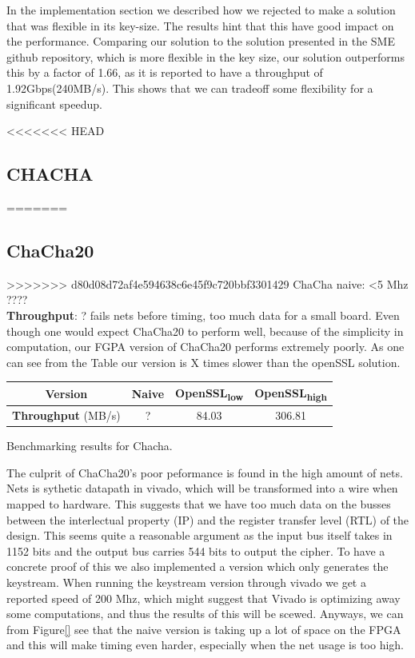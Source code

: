 \documentclass[a4paper]{article}
\begin{document}
\begin{enumerate}
\begin{table}[htbp]
\end{table}
In the implementation section we described how we rejected to make a solution that was flexible in its key-size. The results hint that this have good impact on the performance. Comparing our solution to the solution presented in the SME github repository, which is more flexible in the key size, our solution outperforms this by a factor of 1.66, as it is reported to have a throughput of 1.92Gbps(240MB/s)\cite{sme}. This shows that we can tradeoff some flexibility for a significant speedup.


<<<<<<< HEAD
\subsection{CHACHA}
\label{sec:orge79be4e}
=======
\subsection{ChaCha20}
\label{sec:org6c33309}
>>>>>>> d80d08d72af4e594638c6e45f9c720bbf3301429
ChaCha naive: <5 Mhz ????\\
\textbf{Throughput}: ?
fails nets before timing, too much data for a small board.
Even though one would expect ChaCha20 to perform well, because of the simplicity in computation, our FGPA version of ChaCha20 performs extremely poorly. As one can see from the Table our version is X times slower than the openSSL solution.
\begin{table}[htbp]
\centering
\begin{tabular}{|c|c|c|c|}
\hline
\textbf{Version} & Naive & OpenSSL\textsubscript{low} & OpenSSL\textsubscript{high}\\
\hline
\textbf{Throughput} (MB/s) & ? & 84.03 & 306.81\\
\hline
\end{tabular}
Benchmarking results for Chacha.

\end{table}
The culprit of ChaCha20's poor peformance is found in the high amount of nets. Nets is sythetic datapath in vivado, which will be transformed into a wire when mapped to hardware. This suggests that we have too much data on the busses between the interlectual property (IP) and the register transfer level (RTL) of the design. This seems quite a reasonable argument as the input bus itself takes in 1152 bits and the output bus carries 544 bits to output the cipher.
To have a concrete proof of this we also implemented a version which only generates the keystream. When running the keystream version through vivado we get a reported speed of 200 Mhz, which might suggest that Vivado is optimizing away some computations, and thus the results of this will be scewed. Anyways, we can from Figure\ref{} see that the naive version is taking up a lot of space on the FPGA and this will make timing even harder, especially when the net usage is too high.


\end{enumerate}
\end{document}

